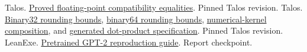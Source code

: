 \documentclass[11pt]{article}
\newcommand{\src}[2]{\href{https://github.com/jsmorph/leanexe/blob/4360920c3060d1c625b1860229b5116804d177c8/#1}{#2}}
\newcommand{\talossrc}[2]{\href{https://github.com/jsmorph/talos/blob/87e3aa5e8f6e6f3b3eb5e7e4c5aba43071002d47/#1}{#2}}
\begin{document}
\begin{thebibliography}{99}
 Talos.  \talossrc{codelib/CodeLib/IEEE32/Exec.lean}{Proved floating-point compatibility equalities}.  Pinned Talos revision.
 Talos.  \talossrc{codelib/CodeLib/IEEE32/Roundoff.lean}{Binary32 rounding bounds}, \talossrc{codelib/CodeLib/IEEE64/Roundoff.lean}{binary64 rounding bounds}, \talossrc{codelib/CodeLib/Numerical/Kernels.lean}{numerical-kernel composition}, and \talossrc{programs/lean/Project/F64Dot/Spec.lean}{generated dot-product specification}.  Pinned Talos revision.
 LeanExe.  \src{data/gpt2-124m/README.md}{Pretrained GPT-2 reproduction guide}.  Report checkpoint.
\end{thebibliography}
\end{document}
